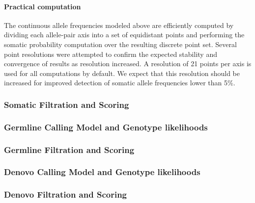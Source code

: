 \documentclass{article}
\begin{document}
\paragraph{Practical computation}
The continuous allele frequencies modeled above are efficiently computed by dividing each allele-pair axis into a set of equidistant points and performing the somatic probability computation over the resulting discrete point set. Several point resolutions were attempted to confirm the expected stability and convergence of results as resolution increased. A resolution of 21 points per axis is used for all computations by default. We expect that this resolution should be increased for improved detection of somatic allele frequencies lower than 5\%.

\subsubsection{Somatic Filtration and Scoring}

\subsubsection{Germline Calling Model and Genotype likelihoods}

\subsubsection{Germline Filtration and Scoring}

\subsubsection{Denovo Calling Model and Genotype likelihoods}

\subsubsection{Denovo Filtration and Scoring}




\end{document}
